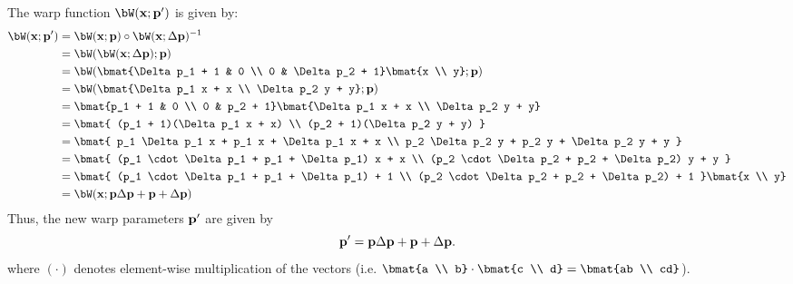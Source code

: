 \begin{problem}
\begin{enumroman}
    \begin{answer}
      The warp function $\bW(\bx; \bp')$ is given by:
      \begin{align*}
        \bW(\bx; \bp') &= \bW(\bx; \bp) \circ \bW(\bx; \Delta \bp)^{-1} \\
        &= \bW(\bW(\bx; \Delta \bp); \bp) \\
        &= \bW(\bmat{\Delta p_1 + 1 & 0 \\ 0 & \Delta p_2 + 1} \bmat{x \\ y}; \bp) \\
        &= \bW(\bmat{\Delta p_1 x + x \\ \Delta p_2 y + y}; \bp) \\
        &= \bmat{p_1 + 1 & 0 \\ 0 & p_2 + 1} \bmat{\Delta p_1 x + x \\ \Delta p_2 y + y} \\
        &= \bmat{
          (p_1 + 1)(\Delta p_1 x + x) \\
          (p_2 + 1)(\Delta p_2 y + y)
        } \\
        &= \bmat{
          p_1 \Delta p_1 x + p_1 x + \Delta p_1 x + x \\
          p_2 \Delta p_2 y + p_2 y + \Delta p_2 y + y
        } \\
        &= \bmat{
          (p_1 \cdot \Delta p_1 + p_1 + \Delta p_1) x + x \\
          (p_2 \cdot \Delta p_2 + p_2 + \Delta p_2) y + y
        } \\
        &= \bmat{
          (p_1 \cdot \Delta p_1 + p_1 + \Delta p_1) + 1 \\
          (p_2 \cdot \Delta p_2 + p_2 + \Delta p_2) + 1
        } \bmat{x \\ y} \\
        &= \bW(\bx; \bp \Delta \bp + \bp + \Delta \bp)
      \end{align*}
      Thus, the new warp parameters $\mathbf{p}'$ are given by
      \begin{equation}
        \mathbf{p}' = \mathbf{p} \Delta \mathbf{p} + \mathbf{p} + \Delta \mathbf{p}.
        \label{eq:ans:2.4}
      \end{equation}
      where $(\cdot)$ denotes element-wise multiplication of the vectors
      (i.e. $\bmat{a \\ b} \cdot \bmat{c \\ d} = \bmat{ab \\ cd}$). 
    \end{answer}
  \end{enumroman}
\end{problem}
